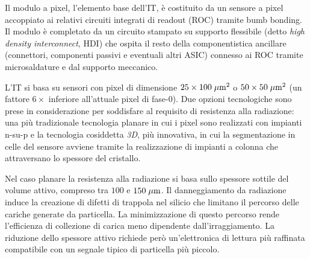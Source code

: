 
Il modulo a pixel, l'elemento base dell'IT, \`e costituito da un sensore a pixel accoppiato ai relativi circuiti integrati di readout (ROC) tramite bumb bonding. Il modulo \`e completato da un circuito stampato su supporto flessibile (detto {\em high density interconnect}, HDI) che ospita il resto della componentistica ancillare (connettori, componenti passivi e eventuali altri ASIC) connesso ai ROC tramite microsaldature e dal supporto meccanico.

%
%
 
L'IT si basa su sensori con pixel di dimensione $25\times100\; \mu \rm m^2$ o $50\times50\; \mu \rm m^2$ (un fattore $6\times$ inferiore all'attuale pixel di fase-0). Due opzioni tecnologiche sono prese in considerazione per soddisfare al requisito di resistenza alla radiazione: una pi\`u tradizionale tecnologia planare in cui i pixel sono realizzati con impianti n-su-p e la tecnologia cosiddetta {\em 3D}, pi\`u innovativa, in cui la segmentazione in celle del sensore avviene tramite la realizzazione di impianti a colonna che attraversano lo spessore del cristallo.

Nel caso planare la resistenza alla radiazione si basa sullo spessore sottile del volume attivo, compreso tra $100$ e $150\; \mu \rm m$. Il danneggiamento da radiazione induce la creazione di difetti di trappola nel silicio che limitano il percorso delle cariche generate da particella. La minimizzazione di questo percorso rende l'efficienza di collezione di carica meno dipendente dall'irraggiamento. La riduzione dello spessore attivo richiede per\`o un'elettronica di lettura pi\`u raffinata compatibile con un segnale tipico di particella pi\`u piccolo.

